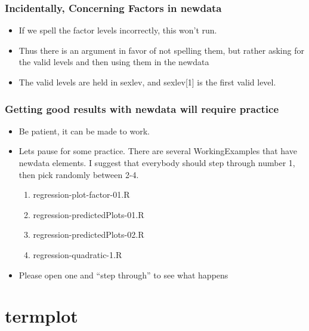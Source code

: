 \documentclass[10pt,english]{beamer}
\def\lyxframeend{} %
\begin{document}
\begin{frame}
\frametitle{Incidentally, Concerning Factors in newdata}
\begin{itemize}
\item If we spell the factor levels incorrectly, this won't run.
\item Thus there is an argument in favor of not spelling them, but rather
asking for the valid levels and then using them in the newdata 




\item The valid levels are held in sexlev, and sexlev{[}1{]} is the first
valid level.
\end{itemize}
\end{frame}

\begin{frame}
\frametitle{Getting good results with newdata will require practice}
\begin{itemize}
\item Be patient, it can be made to work.
\item Lets pause for some practice. There are several WorkingExamples that
have newdata elements. I suggest that everybody should step through
number 1, then pick randomly between 2-4.

\begin{enumerate}
\item regression-plot-factor-01.R
\item regression-predictedPlots-01.R
\item regression-predictedPlots-02.R
\item regression-quadratic-1.R
\end{enumerate}
\item Please open one and ``step through'' to see what happens
\end{itemize}
\end{frame}


\lyxframeend{}\section{termplot}
\end{document}
